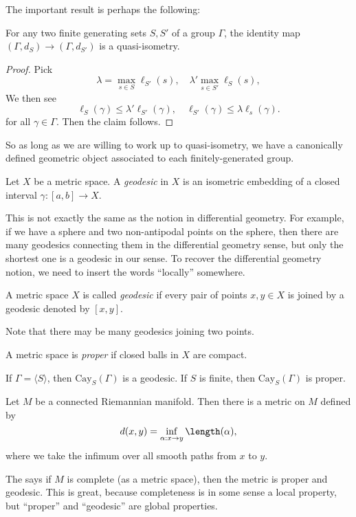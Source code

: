 \documentclass[a4paper]{article}
\newcommand\Cay{\mathrm{Cay}}
\begin{document}
The important result is perhaps the following:
\begin{thm}
  For any two finite generating sets $S, S'$ of a group $\Gamma$, the identity map $(\Gamma, d_S) \to (\Gamma, d_{S'})$ is a quasi-isometry.
\end{thm}

\begin{proof}
  Pick
  \[
    \lambda = \max_{s \in S} \ell_{S'}(s),\quad \lambda' \max_{s \in S'} \ell_{S}(s),
  \]
  We then see
  \[
    \ell_S(\gamma) \leq \lambda' \ell_{S'}(\gamma), \quad \ell_{S'}(\gamma) \leq \lambda \ell_s(\gamma). %
  \]
  for all $\gamma \in \Gamma$. Then the claim follows.
\end{proof}
So as long as we are willing to work up to quasi-isometry, we have a canonically defined geometric object associated to each finitely-generated group.

\begin{defi}[Geodesic]
  Let $X$ be a metric space. A \emph{geodesic} in $X$ is an isometric embedding of a closed interval $\gamma: [a, b] \to X$.
\end{defi}
This is not exactly the same as the notion in differential geometry. For example, if we have a sphere and two non-antipodal points on the sphere, then there are many geodesics connecting them in the differential geometry sense, but only the shortest one is a geodesic in our sense. To recover the differential geometry notion, we need to insert the words ``locally'' somewhere.

\begin{defi}
  A metric space $X$ is called \emph{geodesic} if every pair of points $x, y \in X$ is joined by a geodesic denoted by $[x, y]$.
\end{defi}
Note that there may be many geodesics joining two points.

\begin{defi}
  A metric space is \emph{proper} if closed balls in $X$ are compact.
\end{defi}

\begin{eg}
  If $\Gamma = \langle S\rangle$, then $\Cay_S(\Gamma)$ is a geodesic. If $S$ is finite, then $\Cay_S(\Gamma)$ is proper.
\end{eg}

\begin{eg}
  Let $M$ be a connected Riemannian manifold. Then there is a metric on $M$ defined by 
  \[
    d(x, y) = \inf_{\alpha: x \to y} \length(\alpha),
  \]
  where we take the infimum over all smooth paths from $x$ to $y$.

  The  says if $M$ is complete (as a metric space), then the metric is proper and geodesic. This is great, because completeness is in some sense a local property, but ``proper'' and ``geodesic'' are global properties. 
\end{eg}
\end{document}
